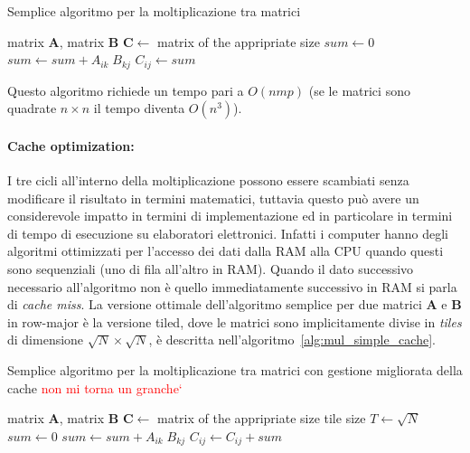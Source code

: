 \documentclass[10pt]{article}
\begin{document}
\begin{algorithm}
\caption{Semplice algoritmo per la moltiplicazione tra matrici}\label{alg:mul_simple}
\begin{algorithmic}[1]
\Require matrix $\mathbf{A}$, matrix $\mathbf{B}$
\State $\mathbf{C} \gets $ matrix of the appripriate size
 
	 
		\State $sum \gets 0$
			\State $sum \gets sum + A_{ik} \; B_{kj}$
		\EndFor
		\State $C_{ij} \gets sum$
	\EndFor
\EndFor
\end{algorithmic}
\end{algorithm}

Questo algoritmo richiede un tempo pari a $O(nmp)$ (se le matrici sono quadrate $n\times n$ il tempo diventa $O(n^3)$).

\paragraph{Cache optimization:} I tre cicli all'interno della moltiplicazione possono essere scambiati senza modificare il risultato in termini matematici, tuttavia questo può avere un considerevole impatto in termini di implementazione ed in particolare in termini di tempo di esecuzione su elaboratori elettronici. Infatti i computer hanno degli algoritmi ottimizzati per l'accesso dei dati dalla RAM alla CPU quando questi sono sequenziali (uno di fila all'altro in RAM). Quando il dato successivo necessario all'algoritmo non è quello immediatamente successivo in RAM si parla di \textit{cache miss}.
La versione ottimale dell'algoritmo semplice per due matrici $\mathbf{A}$ e $\mathbf{B}$ in row-major è la versione tiled, dove le matrici sono implicitamente divise in \textit{tiles} di dimensione $\sqrt{N} \times \sqrt{N}$, è descritta nell'algoritmo~\ref{alg:mul_simple_cache}.

\begin{algorithm}
\caption{Semplice algoritmo per la moltiplicazione tra matrici con gestione migliorata della cache \textcolor{red}{non mi torna un granche`}}\label{alg:mul_simple_cache}
\begin{algorithmic}[1]
\Require matrix $\mathbf{A}$, matrix $\mathbf{B}$
\State $\mathbf{C} \gets $ matrix of the appripriate size
\State tile size $T \gets \sqrt{N}$
			 
					\State $sum \gets 0$
						\State $sum \gets sum + A_{ik} \; B_{kj}$
					\EndFor
					\State $C_{ij} \gets C_{ij} + sum$
				\EndFor
			\EndFor
		\EndFor
	\EndFor
\EndFor
\end{algorithmic}
\end{algorithm}
\end{document}
